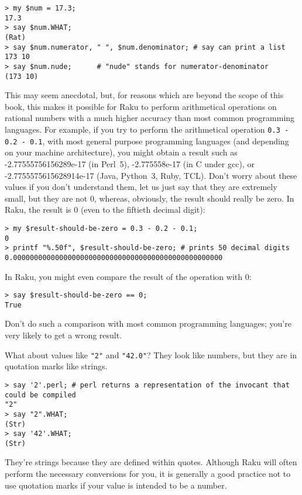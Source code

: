 \begin{verbatim}
> my $num = 17.3;
17.3
> say $num.WHAT;
(Rat)
> say $num.numerator, " ", $num.denominator; # say can print a list
173 10
> say $num.nude;      # "nude" stands for numerator-denominator
(173 10) 
\end{verbatim}
%
This may seem anecdotal, but, for reasons which are 
beyond the scope of this book, this makes it possible for Raku 
to perform arithmetical operations on rational numbers with 
a much higher accuracy than most common programming languages. 
For example, if you try to perform the arithmetical operation
\verb'0.3 - 0.2 - 0.1', with most general purpose programming languages 
(and depending on your machine architecture), you 
might obtain a result such as -2.77555756156289e-17 (in Perl~5), 
-2.775558e-17 (in C under gcc), or -2.7755575615628914e-17 
(Java, Python~3, Ruby, TCL). Don't worry about these values if you 
don't understand them, let us just say that they  are 
extremely small, but they are not 0, whereas,  
obviously, the result should really be zero. In Raku, 
the result is 0 (even to the fiftieth decimal digit):
\begin{verbatim}
> my $result-should-be-zero = 0.3 - 0.2 - 0.1;
0
> printf "%.50f", $result-should-be-zero; # prints 50 decimal digits
0.00000000000000000000000000000000000000000000000000
\end{verbatim}
%
In Raku, you might even compare the result of the operation with 0:
\begin{verbatim}
> say $result-should-be-zero == 0;
True
\end{verbatim}
%
Don't do such a comparison with most common programming 
languages; you're very likely to get a wrong result.

What about values like \verb'"2"' and \verb'"42.0"'?
They look like numbers, but they are in quotation marks like
strings.

\begin{verbatim}
> say '2'.perl; # perl returns a representation of the invocant that could be compiled
"2"
> say "2".WHAT;
(Str)
> say '42'.WHAT;
(Str)
\end{verbatim}
%

They're strings because they are defined within quotes. Although 
Raku will often perform the necessary conversions for you, it 
is generally a good practice not to use quotation marks if your value 
is intended to be a number.

